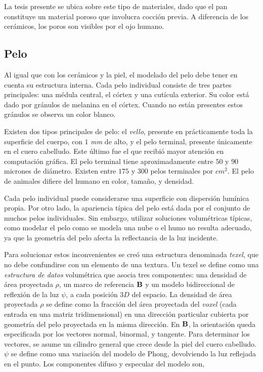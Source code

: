 La tesis presente se ubica sobre este tipo de materiales, dado que el pan constituye un material poroso que involucra cocción previa.
A diferencia de los cerámicos, los poros son visibles por el ojo humano.

\subsection{Pelo}
Al igual que con los cerámicos y la piel, el modelado del pelo debe tener en cuenta su estructura interna.
Cada pelo individual consiste de tres partes principales: una médula central, el córtex y una cutícula exterior.
Su color está dado por gránulos de melanina en el córtex.
Cuando no están presentes estos gránulos se observa un color blanco.


Existen dos tipos principales de pelo: el {\em vello}, presente en prácticamente toda la superficie del cuerpo, con $1$ {\em mm} de alto, y el {pelo terminal}, presente únicamente en el cuero cabelludo.
Este último fue el que recibió mayor atención en computación gráfica.
El pelo terminal tiene aproximadamente entre $50$ y $90$ micrones de diámetro.
Existen entre $175$ y $300$ pelos terminales por {\em $cm^{2}$}.
El pelo de animales difiere del humano en color, tamaño, y densidad.

Cada pelo individual puede considerarse una superficie con dispersión lumínica propia.
Por otro lado, la apariencia típica del pelo está dada por el conjunto de muchos pelos individuales.
Sin embargo, utilizar soluciones volumétricas típicas, como modelar el pelo como se modela una nube o el humo no resulta adecuado, ya que la geometría del pelo afecta la reflectancia de la luz incidente.

Para solucionar estos inconvenientes se creó una estructura denominada {\em texel}, que no debe confundirse con un elemento de una textura.
Un texel se define como una {\em estructura de datos} volumétrica que asocia tres componentes: una densidad de área proyectada $\rho$, un marco de referencia $\bold{B}$ y un modelo bidireccional de reflexión de la luz $\psi$, a cada posición $3D$ del espacio.
La densidad de área proyectada $\rho$ se define como la fracción del área proyectada del {\em voxel} (cada entrada en una matriz tridimensional) en una dirección particular cubierta por geometría del pelo proyectada en la misma dirección.
En $\bold{B}$, la orientación queda especificada por los vectores normal, binormal, y tangente.
Para determinar los vectores, se asume un cilindro general que crece desde la piel del cuero cabelludo.
$\psi$ se define como una variación del modelo de Phong, devolviendo la luz reflejada en el punto.
Los componentes difuso y especular del modelo son,


